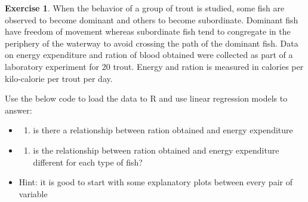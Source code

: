 \documentclass[
]{book}
\newenvironment{Shaded}{\begin{snugshade}}{\end{snugshade}}
\newcommand{\CommentTok}[1]{\textcolor[rgb]{0.56,0.35,0.01}{\textit{#1}}}
\newcommand{\DataTypeTok}[1]{\textcolor[rgb]{0.13,0.29,0.53}{#1}}
\newcommand{\KeywordTok}[1]{\textcolor[rgb]{0.13,0.29,0.53}{\textbf{#1}}}
\newcommand{\NormalTok}[1]{#1}
\newcommand{\OperatorTok}[1]{\textcolor[rgb]{0.81,0.36,0.00}{\textbf{#1}}}
\newcommand{\StringTok}[1]{\textcolor[rgb]{0.31,0.60,0.02}{#1}}
\providecommand{\tightlist}{%
  \setlength{\itemsep}{0pt}\setlength{\parskip}{0pt}}
\theoremstyle{definition}
\theoremstyle{definition}
\theoremstyle{definition}
\newtheorem{exercise}{Exercise}[chapter]
\theoremstyle{remark}
\begin{document}
\begin{exercise}
\protect\hypertarget{exr:lm-trout}{}{\label{exr:lm-trout} }
When the behavior of a group of trout is studied, some fish are observed to become dominant and others to become subordinate. Dominant fish have freedom of movement whereas subordinate fish tend to congregate in the periphery of the waterway to avoid crossing the path of the dominant fish. Data on energy expenditure and ration of blood obtained were collected as part of a laboratory experiment for 20 trout. Energy and ration is measured in calories per kilo-calorie per trout per day.

Use the below code to load the data to R and use linear regression models to answer:

\begin{itemize}
\item
  \begin{enumerate}
  \def\labelenumi{\alph{enumi})}
  \tightlist
  \item
    is there a relationship between ration obtained and energy expenditure
  \end{enumerate}
\item
  \begin{enumerate}
  \def\labelenumi{\alph{enumi})}
  \setcounter{enumi}{1}
  \tightlist
  \item
    is the relationship between ration obtained and energy expenditure different for each type of fish?
  \end{enumerate}
\item
  Hint: it is good to start with some explanatory plots between every pair of variable
\end{itemize}
\end{exercise}

\begin{Shaded}
\end{Shaded}
\end{document}
